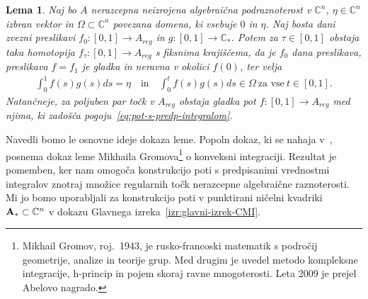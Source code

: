 \documentclass[12pt,a4paper,twoside]{article}
\theoremstyle{definition} %
\theoremstyle{plain} %
\newtheorem{lema}[definicija]{Lema}
\numberwithin{equation}{section}  %
\newcommand{\C}{\mathbb C}
\begin{document}
\begin{lema} \label{lema:analog-gromova}
Naj bo $A$ nerazcepna neizrojena algebraična podraznoterost v $\mathbb{C}^{n}$, $\eta \in \mathbb{C}^{n}$ izbran vektor in $\Omega \subset \mathbb{C}^{n}$ povezana domena, ki vsebuje $0$ in $\eta$. 
Naj bosta dani zvezni preslikavi $f_0 \colon [0,1] \to A_{reg}$ in $g \colon [0,1] \to \mathbb{C}_{*}$.
Potem za $\tau \in [0,1]$ obstaja taka homotopija $f_{\tau} \colon [0,1] \to A_{reg}$ s fiksnima krajiščema, da je $f_0$ dana preslikava, preslikava $f = f_1$ je gladka in neravna v okolici $f(0)$, ter velja
\begin{gather} \label{eq:pot-s-predp-integralom}
\int_{0}^{1} f(s)g(s)ds = \eta \quad \textrm{in} \quad \int_{0}^{t} f(s)g(s)ds \in \Omega \ \textrm{za vse} \ t \in [0,1].
\end{gather}
Natančneje, za poljuben par točk v $A_{reg}$ obstaja gladka pot $f \colon [0,1] \to A_{reg}$ med njima, ki zadošča pogoju~\eqref{eq:pot-s-predp-integralom}.
\end{lema}

Navedli bomo le osnovne ideje dokaza leme. Popoln dokaz, ki se nahaja v~\cite[Lemma~3.5.4]{alarcon2021minimal}, posnema dokaz leme Mikhaila Gromova\footnote{Mikhail Gromov, roj.~1943, je rusko-francoski matematik s področij geometrije, analize in teorije grup. Med drugim je uvedel metodo kompleksne integracije, h-princip in pojem skoraj ravne mnogoterosti. Leta 2009 je prejel Abelovo nagrado.}
o konveksni integraciji. Rezultat je pomemben, ker nam omogoča konstrukcijo poti s predpisanimi vrednostmi integralov znotraj množice regularnih točk nerazcepne algebraične raznoterosti. Mi jo bomo uporabljali za konstrukcijo poti v punktirani ničelni kvadriki $\textup{\textbf{A}}_{*} \subset \C^{n}$ v dokazu Glavnega izreka~\ref{izr:glavni-izrek-CMI}.
\end{document}
